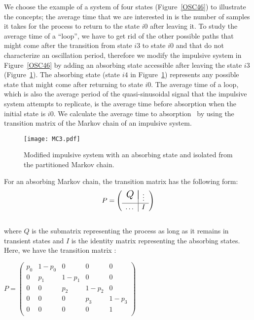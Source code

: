 \documentclass[journal]{IEEEtran}
\begin{document}
We choose the example of a system of four states (Figure~\ref{OSC46}) to illustrate the concepts; the average time that we are interested in is the number of samples it takes for the process to return to the state $i0$ after leaving it. To study the average time of a ``loop'', we have to get rid of the other possible paths that might come after the transition from state $i3$ to state $i0$ and that do not characterize an oscillation period, therefore we modify the impulsive system in Figure~\ref{OSC46} by adding an absorbing state accessible after leaving the state $i3$ (Figure~\ref{MC3}). The absorbing state (state $i4$ in Figure~\ref{MC3}) represents any possible state that might come after returning to state $i0$. The average time of a loop, which is also the average period of the quasi-sinusoidal signal that the impulsive system attempts to replicate, is the average time before absorption when the initial state is $i0$. We calculate the average time to absorption~\cite{MC} by using the transition matrix of the Markov chain of an impulsive system.
\begin{figure}
\begin{center}
\texttt{[image: MC3.pdf]}\\
  \caption{Modified impulsive system with an absorbing state and isolated from the partitioned Markov chain.}\label{MC3}
\end{center}
\end{figure}
For an absorbing Markov chain, the transition matrix has the following form:
\[
P=\left(
\begin{array}{c|c}
  \raisebox{-2pt}{{\Large\mbox{{$Q$}}}} \\[-3ex] & \vdots \\ \hline
   \dots&I\\
\end{array}
\right)
\]
\\
where $Q$ is the submatrix representing the process as long as it remains in transient states and $I$ is the identity matrix representing the absorbing states. Here, we have the transition matrix :
\begin{center}
$P=\left(
  \begin{array}{cccc|c}
    p_0 & 1-p_0 & 0 & 0 & 0 \\
    0 & p_1 & 1-p_1 & 0 & 0 \\
    0 & 0 & p_2 & 1-p_2 & 0 \\
    0 & 0 & 0 & p_3 & 1-p_3 \\ \hline
    0 & 0 & 0 & 0 & 1 \\
  \end{array}
\right)$
\end{center}\
\end{document}
